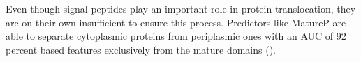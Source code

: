 Even though signal peptides play an important role in protein translocation,
they are on their own insufficient to ensure this process.
Predictors like MatureP are able to separate cytoplasmic proteins from periplasmic ones 
with an AUC of 92 percent based features exclusively from the mature domains
(\cite{orfanoudaki2017}).

